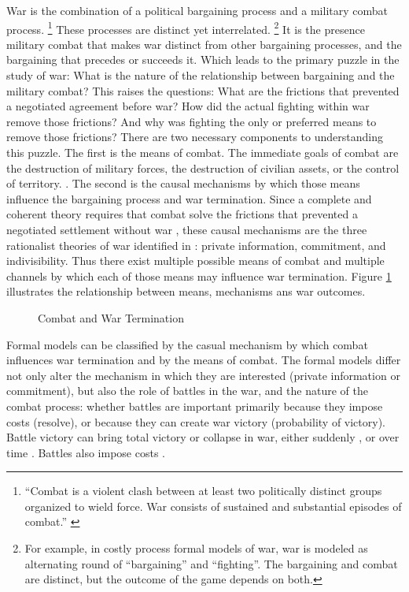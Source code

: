 War is the combination of a political bargaining process and a military combat process. %
\footnote{%
  ``Combat is a violent clash between at least two politically
  distinct groups organized to wield force. War consists of sustained
  and substantial episodes of combat.'' \parencite{Reiter2003} %
} %
These processes are distinct yet interrelated.%
\footnote{%
  For example, in costly process formal models of war, war is modeled
  as alternating round of ``bargaining'' and ``fighting''. %
  The bargaining and combat are distinct, but the outcome of the game
  depends on both. %
} %
It is the presence military combat that makes war distinct from other bargaining processes, and the bargaining that precedes or succeeds it. %
Which leads to the primary puzzle in the study of war: What is the nature of the relationship between bargaining and the military combat?
This raises the questions:
What are the frictions that prevented a negotiated agreement before war?
How did the actual fighting within war remove those frictions?
And why was fighting the only or preferred means to remove those frictions?
There are two necessary components to understanding this puzzle. %
The first is the means of combat. %
The immediate goals of combat are the destruction of military forces, the destruction of civilian assets, or the control of territory.
\parencite[30]{Reiter2003}. %
The second is the causal mechanisms by which those means influence the bargaining process and war termination. %
Since a complete and coherent theory requires that combat solve the frictions that prevented a negotiated settlement without war \parencite{LeventogluSlantchev2007}, these causal mechanisms are the three rationalist theories of war identified in \textcite{Fearon1995}: private information, commitment, and indivisibility. %
Thus there exist multiple possible means of combat and multiple channels by which each of those means may influence war termination.
Figure \ref{bonds_battles:fig:combat-causal-diagram} illustrates the relationship between means, mechanisms ans war outcomes.

\begin{figure}[htpb]
  \centering
  
  \caption{Combat and War Termination}
  \label{bonds_battles:fig:combat-causal-diagram}
\end{figure}


Formal models can be classified by the casual mechanism by which combat influences war termination and by the means of combat. %
The formal models differ not only alter the mechanism in which they are interested (private information or commitment), but also the role of battles in the war, and the nature of the combat process: whether battles are important primarily because they impose costs (resolve), or because they can create war victory (probability of victory). %
Battle victory can bring total victory or collapse in war, either suddenly \parencites{Powell2004}{Wagner2000}{LeventogluSlantchev2007}, or over time \parencites{Slantchev2003}{SmithStam2004}.
Battles also impose costs \parencites{FilsonWerner2002}{Powell2004}{LeventogluSlantchev2007}. %

